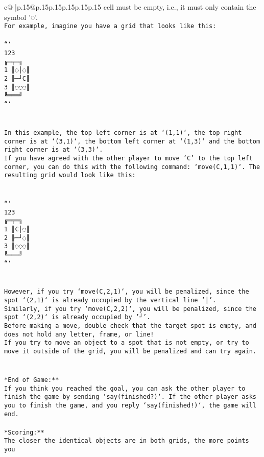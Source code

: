 \documentclass{article}
\begin{document}
{\begin{supertabular}{c@{$\;$}|p{.15\linewidth}@{}p{.15\linewidth}p{.15\linewidth}p{.15\linewidth}p{.15\linewidth}p{.15\linewidth}}
{{{cell must be empty, i.e., it must only contain the symbol '◌'.\\ \tt * For example, imagine you have a grid that looks like this: \\ \tt \\ \tt ```\\ \tt     123\\ \tt    ╔═╤═╗\\ \tt  1 ║◌│◌║\\ \tt  2 ╟─┘C║\\ \tt  3 ║◌◌◌║\\ \tt    ╚═══╝\\ \tt ```\\ \tt \\ \tt \\ \tt * In this example, the top left corner is at `(1,1)`, the top right corner is at `(3,1)`, the bottom left corner at `(1,3)` and the bottom right corner is at `(3,3)`.\\ \tt * If you have agreed with the other player to move 'C' to the top left corner, you can do this with the following command: `move(C,1,1)`. The resulting grid would look like this: \\ \tt \\ \tt \\ \tt ```\\ \tt     123\\ \tt    ╔═╤═╗\\ \tt  1 ║C│◌║\\ \tt  2 ╟─┘◌║\\ \tt  3 ║◌◌◌║\\ \tt    ╚═══╝\\ \tt ```\\ \tt \\ \tt \\ \tt * However, if you try `move(C,2,1)`, you will be penalized, since the spot `(2,1)` is already occupied by the vertical line '│'.\\ \tt * Similarly, if you try `move(C,2,2)`, you will be penalized, since the spot `(2,2)` is already occupied by '┘'.\\ \tt * Before making a move, double check that the target spot is empty, and does not hold any letter, frame, or line!\\ \tt * If you try to move an object to a spot that is not empty, or try to move it outside of the grid, you will be penalized and can try again.\\ \tt \\ \tt \\ \tt **End of Game:**\\ \tt If you think you reached the goal, you can ask the other player to finish the game by sending `say(finished?)`. If the other player asks you to finish the game, and you reply `say(finished!)`, the game will end.\\ \tt \\ \tt **Scoring:**\\ \tt The closer the identical objects are in both grids, the more points you }}}
\end{supertabular}}
\end{document}
